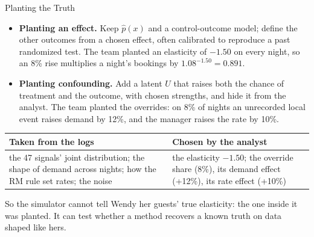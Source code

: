 \documentclass[aspectratio=169, 11pt, handout]{beamer}
\begin{document}
\begin{frame}{Planting the Truth}

\begin{itemize}
  \item \textbf{Planting an effect.} Keep $\hat p(x)$ and a control-outcome model; define the other outcomes from a chosen effect, often calibrated to reproduce a past randomized test. The team planted an elasticity of $-1.50$ on every night, so an 8\% rise multiplies a night's bookings by $1.08^{-1.50} = 0.891$.
  \item \textbf{Planting confounding.} Add a latent $U$ that raises both the chance of treatment and the outcome, with chosen strengths, and hide it from the analyst. The team planted the overrides: on 8\% of nights an unrecorded local event raises demand by 12\%, and the manager raises the rate by 10\%.
\end{itemize}

\begin{center}
\small
\begin{tabular}{p{6.2cm}p{6.2cm}}
\toprule
\textbf{Taken from the logs} & \textbf{Chosen by the analyst} \\
\midrule
the 47 signals' joint distribution; the shape of demand across nights; how the RM rule set rates; the noise & the elasticity $-1.50$; the override share (8\%), its demand effect (+12\%), its rate effect (+10\%) \\
\bottomrule
\end{tabular}
\end{center}

So the simulator cannot tell Wendy her guests' true elasticity: the one inside it was planted. It can test whether a method recovers a known truth on data shaped like hers.
\end{frame}
\end{document}
